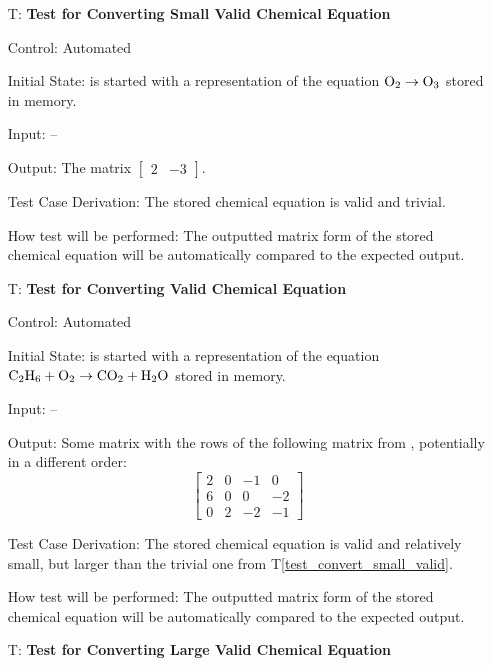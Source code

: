 \documentclass[12pt, titlepage]{article}
\newcounter{testnum} %
\newcommand{\testref}[1]{T\ref{#1}}
\begin{document}
\begin{enumerate}

  \item[T\refstepcounter{testnum}\thetestnum \label{test_convert_small_valid}:]
    \textbf{Test for Converting Small Valid Chemical Equation}

    Control: Automated

    Initial State: \progname{} is started with a representation of the equation
    $\ce{O2} \rightarrow \ce{O3}$ \cite{fahey_twenty_2011} stored in memory.

    Input: --

    Output: The matrix
    $\begin{bmatrix}
        2 & -3
      \end{bmatrix}$.

    Test Case Derivation: The stored chemical equation is valid and trivial.

    How test will be performed: The outputted matrix form of the stored
    chemical equation will be automatically compared to the expected output.

  \item[T\refstepcounter{testnum}\thetestnum \label{test_convert_valid}:]
    \textbf{Test for Converting Valid Chemical Equation}

    Control: Automated

    Initial State: \progname{} is started with a representation of the equation
    $\ce{C2H6} + \ce{O2} \rightarrow \ce{CO2} + \ce{H2O}$
    \cite{hamid_balancing_2019} stored in memory.

    Input: --

    Output: Some matrix with the rows of the following matrix from
    \cite{hamid_balancing_2019}, potentially in a different order:
    $$\begin{bmatrix}
        2 & 0 & -1 & 0  \\
        6 & 0 & 0  & -2 \\
        0 & 2 & -2 & -1
      \end{bmatrix}$$

    Test Case Derivation: The stored chemical equation is valid and relatively
    small, but larger than the trivial one from
    \testref{test_convert_small_valid}.

    How test will be performed: The outputted matrix form of the stored
    chemical equation will be automatically compared to the expected output.

  \item[T\refstepcounter{testnum}\thetestnum \label{test_convert_large_valid}:]
    \textbf{Test for Converting Large Valid Chemical Equation}


\end{enumerate}
\end{document}
